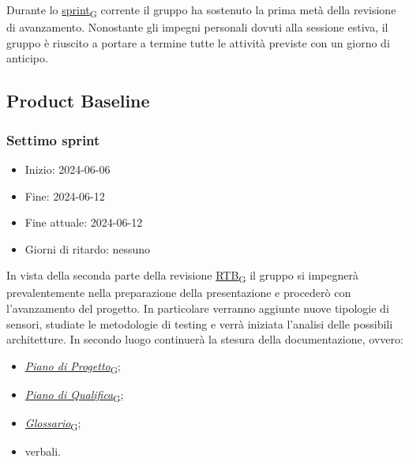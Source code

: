 Durante lo \href{https://7last.github.io/docs/pb/documentazione-interna/glossario\#sprint}{sprint\textsubscript{G}} corrente il gruppo ha sostenuto la prima metà della revisione di avanzamento. Nonostante gli impegni personali dovuti alla sessione estiva, il gruppo è riuscito a portare a termine tutte le attività previste con un giorno di anticipo.



\newpage
\subsection{Product Baseline}
\subsubsection{Settimo sprint}
\begin{itemize}
	\item Inizio: 2024-06-06
	\item Fine: 2024-06-12
	\item Fine attuale: 2024-06-12
	\item Giorni di ritardo: nessuno
\end{itemize}

In vista della seconda parte della revisione \href{https://7last.github.io/docs/pb/documentazione-interna/glossario\#requirements-and-technology-baseline}{RTB\textsubscript{G}} il gruppo si impegnerà prevalentemente nella preparazione della presentazione e procederò con l'avanzamento del progetto. In particolare verranno aggiunte nuove tipologie di sensori, studiate le metodologie di testing e verrà iniziata l'analisi delle possibili architetture. In secondo luogo continuerà la stesura della documentazione, ovvero:
\begin{itemize}
	\item \href{https://7last.github.io/docs/pb/documentazione-interna/glossario\#piano-di-progetto}{\textit{Piano di Progetto}\textsubscript{G}};
	\item \href{https://7last.github.io/docs/pb/documentazione-interna/glossario\#piano-di-qualifica}{\textit{Piano di Qualifica}\textsubscript{G}};
	\item \href{https://7last.github.io/docs/pb/documentazione-interna/glossario\#glossario}{\textit{Glossario}\textsubscript{G}};
	\item verbali.
\end{itemize}

